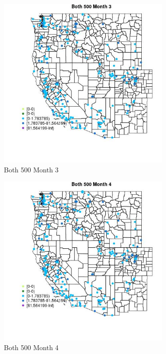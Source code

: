 \begin{figure} 
\centering  
\includegraphics[width=0.77\textwidth]{Code_Outputs/Report_ML_input_PM25_Step4_part_e_de_duplicated_aveswNAs_MapObsMo3Both_500.jpg} 
\caption{\label{fig:Report_ML_input_PM25_Step4_part_e_de_duplicated_aveswNAsMapObsMo3Both_500}Both 500 Month 3} 
\end{figure} 
 

\begin{figure} 
\centering  
\includegraphics[width=0.77\textwidth]{Code_Outputs/Report_ML_input_PM25_Step4_part_e_de_duplicated_aveswNAs_MapObsMo4Both_500.jpg} 
\caption{\label{fig:Report_ML_input_PM25_Step4_part_e_de_duplicated_aveswNAsMapObsMo4Both_500}Both 500 Month 4} 
\end{figure} 
 

